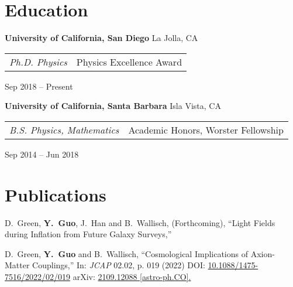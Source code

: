 \documentclass[letterpaper,12pt]{article}
\begin{document}
\section{Education}

\textbf{University of California, San Diego} \hfill La Jolla, CA \\
\begin{tabular}{p{12em} p{20em}}
    \textit{Ph.D. Physics} 
    & Physics Excellence Award 
\end{tabular}
\hfill Sep 2018 -- Present

\textbf{University of California, Santa Barbara} \hfill Isla Vista, CA \\
\begin{tabular}{p{12em} p{20em}}
    \textit{B.S. Physics, Mathematics}
    & Academic Honors, Worster Fellowship
\end{tabular}
\hfill Sep 2014 -- Jun 2018


\section{Publications}

D.~Green, \textbf{Y.~Guo}, J.~Han and B.~Wallisch, (Forthcoming),
``Light Fields during Inflation from Future Galaxy Surveys,''

D.~Green, \textbf{Y.~Guo} and B.~Wallisch,
``Cosmological Implications of Axion-Matter Couplings,''
In: \textit{JCAP} 02.02, p. 019 (2022)
DOI: \href{https://iopscience.iop.org/article/10.1088/1475-7516/2022/02/019}{10.1088/1475-7516/2022/02/019}
arXiv: \href{https://arxiv.org/abs/2109.12088?context=hep-ph}{2109.12088 [astro-ph.CO].}
\end{document}
